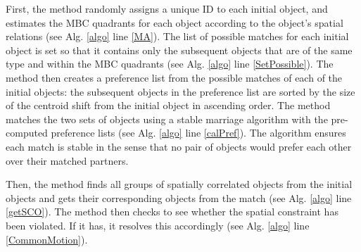 \documentclass[letterpaper]{article}
\begin{document}
First, the method randomly assigns a unique ID to each initial object, and estimates the MBC quadrants for each object according to the object's spatial relations (see Alg. \ref{algo} line \ref{MA}). The list of possible matches for each initial object is set so that it contains only the subsequent objects that are of the same type and within the MBC quadrants (see Alg. \ref{algo} line \ref{SetPossible}). The method then creates a preference list from the possible matches of each of the initial objects: the subsequent objects in the preference list are sorted by the size of the centroid shift from the initial object in ascending order. The method matches the two sets of objects using a stable marriage algorithm \cite{gale1962college} with the pre-computed preference lists (see Alg. \ref{algo} line \ref{calPref}). The algorithm ensures each match is stable in the sense that no pair of objects would prefer each other over their matched partners. 

Then, the method finds all groups of spatially correlated objects from the initial objects and gets their corresponding objects from the match (see Alg. \ref{algo} line \ref{getSCO}). The method then checks to see whether the spatial constraint  has been violated. If it has, it resolves this accordingly (see Alg. \ref{algo} line \ref{CommonMotion}).
\end{document}
